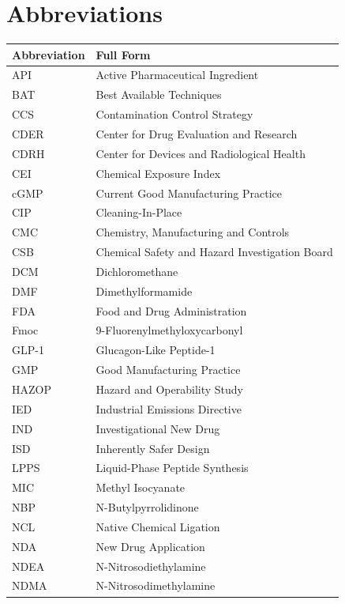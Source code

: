 \section*{Abbreviations}

\begin{longtable}{@{}lp{}@{}}
\textbf{Abbreviation} & \textbf{Full Form} \\[4pt]
\endhead
API     & Active Pharmaceutical Ingredient \\
BAT     & Best Available Techniques \\
CCS     & Contamination Control Strategy \\
CDER    & Center for Drug Evaluation and Research \\
CDRH    & Center for Devices and Radiological Health \\
CEI     & Chemical Exposure Index \\
cGMP    & Current Good Manufacturing Practice \\
CIP     & Cleaning-In-Place \\
CMC     & Chemistry, Manufacturing and Controls \\
CSB     & Chemical Safety and Hazard Investigation Board \\
DCM     & Dichloromethane \\
DMF     & Dimethylformamide \\
FDA     & Food and Drug Administration \\
Fmoc    & 9-Fluorenylmethyloxycarbonyl \\
GLP-1   & Glucagon-Like Peptide-1 \\
GMP     & Good Manufacturing Practice \\
HAZOP   & Hazard and Operability Study \\
IED     & Industrial Emissions Directive \\
IND     & Investigational New Drug \\
ISD     & Inherently Safer Design \\
LPPS    & Liquid-Phase Peptide Synthesis \\
MIC     & Methyl Isocyanate \\
NBP     & N-Butylpyrrolidinone \\
NCL     & Native Chemical Ligation \\
NDA     & New Drug Application \\
NDEA    & N-Nitrosodiethylamine \\
NDMA    & N-Nitrosodimethylamine \\

\end{longtable}
